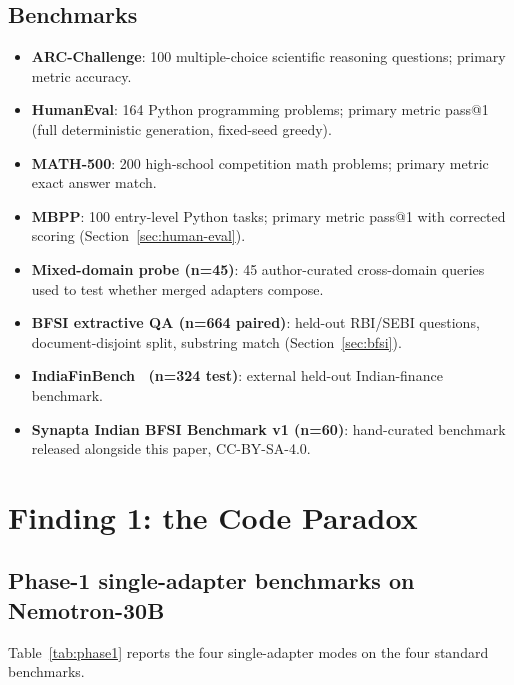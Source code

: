 \documentclass{article}
\begin{document}
\subsection{Benchmarks}
\begin{itemize}[leftmargin=*]
  \item \textbf{ARC-Challenge}: 100 multiple-choice scientific reasoning questions; primary metric accuracy.
  \item \textbf{HumanEval}: 164 Python programming problems; primary metric pass@1 (full deterministic generation, fixed-seed greedy).
  \item \textbf{MATH-500}: 200 high-school competition math problems; primary metric exact answer match.
  \item \textbf{MBPP}: 100 entry-level Python tasks; primary metric pass@1 with corrected scoring (Section~\ref{sec:human-eval}).
  \item \textbf{Mixed-domain probe (n=45)}: 45 author-curated cross-domain queries used to test whether merged adapters compose.
  \item \textbf{BFSI extractive QA (n=664 paired)}: held-out RBI/SEBI questions, document-disjoint split, substring match (Section~\ref{sec:bfsi}).
  \item \textbf{IndiaFinBench~\citep{pall2026indiafinbench} (n=324 test)}: external held-out Indian-finance benchmark.
  \item \textbf{Synapta Indian BFSI Benchmark v1 (n=60)}: hand-curated benchmark released alongside this paper, CC-BY-SA-4.0.
\end{itemize}


\section{Finding 1: the Code Paradox}
\label{sec:paradox}

\subsection{Phase-1 single-adapter benchmarks on Nemotron-30B}

Table~\ref{tab:phase1} reports the four single-adapter modes on the four standard benchmarks.
\end{document}
